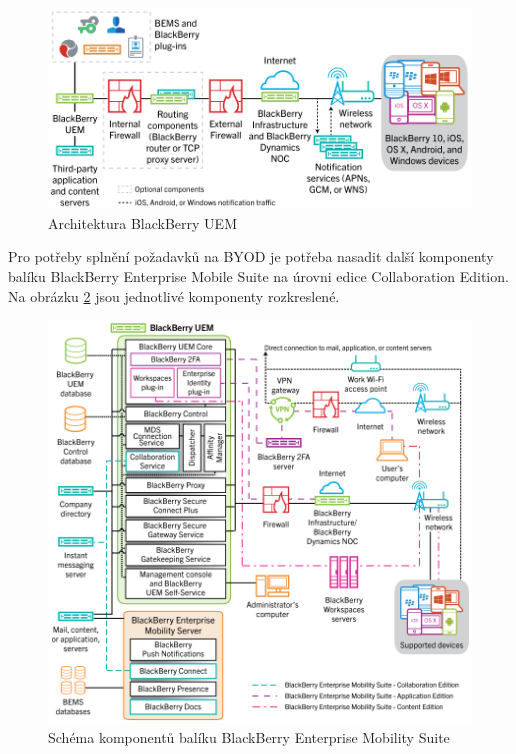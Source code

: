 \begin{figure}[h!]\label{BBUEM1}
\centering
\includegraphics[width=12cm]{img/BBUEM1}
\caption{Architektura BlackBerry UEM}
\end{figure} 

Pro potřeby splnění požadavků na BYOD je potřeba nasadit další komponenty balíku BlackBerry Enterprise Mobile Suite na úrovni edice Collaboration Edition. Na obrázku \ref{BBEMS} jsou jednotlivé komponenty rozkreslené.

\begin{figure}[h!]\label{BBEMS}
\centering
\includegraphics[width=13cm]{img/BBEMS}
\caption{Schéma komponentů balíku BlackBerry Enterprise Mobility Suite}
\end{figure} 

